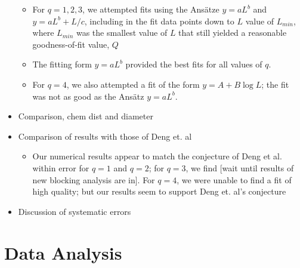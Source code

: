 \documentclass{umthesis}          %
\begin{document}
\begin{itemize}
\begin{itemize}

\item For $q=1,2,3$, we attempted fits using the Ans\"{a}tze $y=aL^b$ and $y=aL^b+L/c$, including in the fit data points down to $L$ value of $L_{min}$, where $L_{min}$ was the smallest value of $L$ that still yielded a reasonable goodness-of-fit value, $Q$\\
\label{sec-4.3.2.1}


\item The fitting form $y=aL^b$ provided the best fits for all values of $q$.\\
\label{sec-4.3.2.2}


\item For $q=4$, we also attempted a fit of the form $y=A+B \log L$; the fit was not as good as the Ans\"{a}tz $y=aL^b$.\\
\label{sec-4.3.2.3}

\end{itemize} %

\item Comparison, chem dist and diameter\\
\label{sec-4.4.1}


\item Comparison of results with those of Deng et. al\\
\label{sec-4.4.2}

\begin{itemize}

\item Our numerical results appear to match the conjecture of Deng et al. \cite{Deng2010} within error for $q=1$ and $q=2$; for $q=3$, we find [wait until results of new blocking analysis are in].  For $q=4$, we were unable to find a fit of high quality; but our results seem to support Deng et. al's conjecture\\
\label{sec-4.4.2.1}

\end{itemize} %

\item Discussion of systematic errors\\
\label{sec-4.4.3}

\end{itemize} %
\section{Data Analysis}
\label{sec-4.3}
\end{document}
